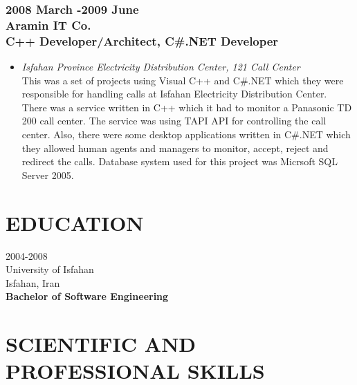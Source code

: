\documentclass[10pt,a4paper]{article}
\begin{document}
\subsubsection{\textnormal {2008 March -2009 June} \\ \textnormal {Aramin IT Co.} \\ C++ Developer/Architect, C\#.NET Developer}
  \setlength{\leftskip}{0.5cm}
  \setlength{\rightskip}{1cm}
  \begin{itemize}
    \setlength{\rightskip}{2cm}
    \setlength\itemsep{0em}
    \item \small \textit{Isfahan Province Electricity Distribution Center, 121 Call Center} \\					
		This was a set of projects using Visual C++ and C\#.NET which they were responsible for handling calls at Isfahan Electricity Distribution Center. There was a service written in C++ which it had to monitor a Panasonic TD 200 call center. The service was using TAPI API for controlling the call center. Also, there were some desktop applications written in C\#.NET which they allowed human agents and managers to monitor, accept, reject and redirect the calls. Database system used for this project was Micrsoft SQL Server 2005.
	\end{itemize}
  \setlength{\leftskip}{0pt}
  \setlength{\rightskip}{0cm}


\section{EDUCATION}

2004-2008 \\
University of Isfahan \\
Isfahan, Iran \\
\textbf{Bachelor of Software Engineering}


\section{SCIENTIFIC AND PROFESSIONAL SKILLS}
\end{document}
